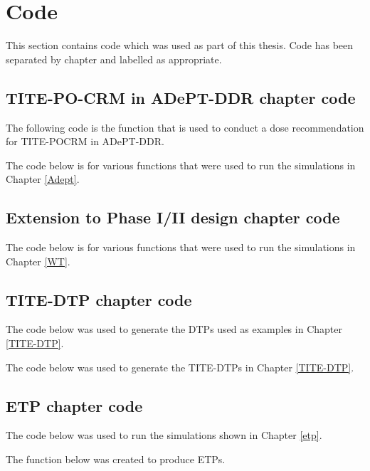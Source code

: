 
\chapter{Code} %

\label{AppendixCode} %

This section contains code which was used as part of this thesis. Code has been separated by chapter and labelled as appropriate. 

\section{TITE-PO-CRM in ADePT-DDR chapter code}

The following code is the function that is used to conduct a dose recommendation for TITE-POCRM in ADePT-DDR.



The code below is for various functions that were used to run the simulations in Chapter \ref{Adept}. 



\section{Extension to Phase I/II design chapter code}

The code below is for various functions that were used to run the simulations in Chapter \ref{WT}. 



\section{TITE-DTP chapter code}

The code below was used to generate the DTPs used as examples in Chapter \ref{TITE-DTP}. 



The code below was used to generate the TITE-DTPs in Chapter \ref{TITE-DTP}.



\section{ETP chapter code}

The code below was used to run the simulations shown in Chapter \ref{etp}.




The function below was created to produce ETPs. 

